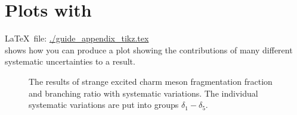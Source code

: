 
\chapter{Plots with \Package{\TikZ}}%
\label{sec:app:tikz}

\LaTeX\ file: \url{./guide_appendix_tikz.tex}\\[1ex]
\noindent
{} shows how you can produce a plot showing
the contributions of many different systematic uncertainties to a
result.

\begin{figure}[htbp]
  \centering
  
  \caption[Strange $D^{**}$ systematics, fragmentation fractions]{The
    results of strange excited charm meson fragmentation fraction and
    branching ratio with systematic variations.  The individual
    systematic variations are put into groups $\delta_1-\delta_5$.}%
  \label{fig:tikz:syst}
\end{figure}

